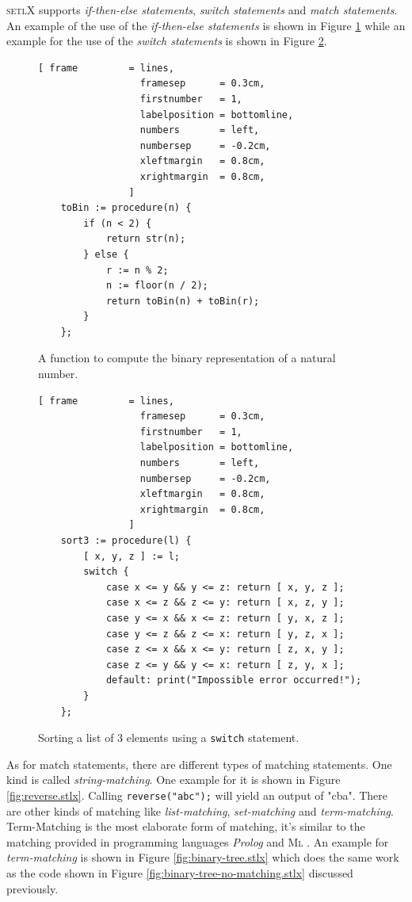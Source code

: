 \documentclass[11pt]{report}
\begin{document}
\textsc{setlX} supports \textsl{if-then-else statements}, \textsl{switch statements} and \textsl{match statements}. An example of the use of the \textsl{if-then-else statements} is shown in Figure \ref{fig:toBin.stlx} while an example for the use of the \textsl{switch statements} is shown in Figure \ref{fig:sort3switch.stlx}.

\begin{figure}[!ht]
\centering
\begin{Verbatim}[ frame         = lines, 
                  framesep      = 0.3cm, 
                  firstnumber   = 1,
                  labelposition = bottomline,
                  numbers       = left,
                  numbersep     = -0.2cm,
                  xleftmargin   = 0.8cm,
                  xrightmargin  = 0.8cm,
                ]
    toBin := procedure(n) {
        if (n < 2) {
            return str(n);
        } else {
            r := n % 2;
            n := floor(n / 2);
            return toBin(n) + toBin(r);
        }
    };
\end{Verbatim}
\vspace*{-0.3cm}
\caption{A function to compute the binary representation of a natural number.}
\label{fig:toBin.stlx}
\end{figure}

\begin{figure}[!ht]
\centering
\begin{Verbatim}[ frame         = lines, 
                  framesep      = 0.3cm, 
                  firstnumber   = 1,
                  labelposition = bottomline,
                  numbers       = left,
                  numbersep     = -0.2cm,
                  xleftmargin   = 0.8cm,
                  xrightmargin  = 0.8cm,
                ]
    sort3 := procedure(l) {
        [ x, y, z ] := l;
        switch {
            case x <= y && y <= z: return [ x, y, z ];
            case x <= z && z <= y: return [ x, z, y ];
            case y <= x && x <= z: return [ y, x, z ];
            case y <= z && z <= x: return [ y, z, x ];
            case z <= x && x <= y: return [ z, x, y ];
            case z <= y && y <= x: return [ z, y, x ];
            default: print("Impossible error occurred!");
        }
    };
\end{Verbatim}
\vspace*{-0.3cm}
\caption{Sorting a list of 3 elements using a \texttt{switch} statement.}
\label{fig:sort3switch.stlx}
\end{figure}

As for match statements, there are different types of matching statements. One kind is called \textsl{string-matching}. One example for it is shown in Figure \ref{fig:reverse.stlx}. Calling \texttt{reverse("abc");} will yield an output of "cba". There are other kinds of matching like \textsl{list-matching}, \textsl{set-matching} and \textsl{term-matching}. Term-Matching is the most elaborate form of matching, it's similar to the matching provided in programming languages \textsl{Prolog} \cite{bratko:90} and \textsc{Ml} \cite{milner:90}. An example for \textsl{term-matching} is shown in Figure \ref{fig:binary-tree.stlx} which does the same work as the code shown in Figure \ref{fig:binary-tree-no-matching.stlx} discussed previously.
\end{document}
